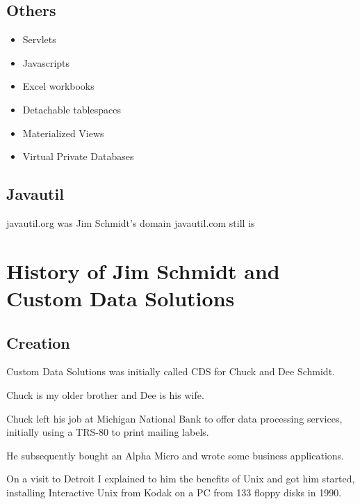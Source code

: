 \documentclass[letterpaper,10pt,english]{sphinxmanual}
\begin{document}
\subsection{Others}
\label{\detokenize{Contributions:others}}\begin{itemize}
\item {} 
Servlets

\item {} 
Javascripts

\item {} 
Excel workbooks

\item {} 
Detachable tablespaces

\item {} 
Materialized Views

\item {} 
Virtual Private Databases

\end{itemize}


\subsection{Javautil}
\label{\detokenize{Contributions:javautil}}
javautil.org was Jim Schmidt’s domain
javautil.com still is


\section{History of Jim Schmidt and Custom Data Solutions}
\label{\detokenize{Contributions:history-of-jim-schmidt-and-custom-data-solutions}}

\subsection{Creation}
\label{\detokenize{Contributions:creation}}
Custom Data Solutions was initially called CDS for Chuck and Dee Schmidt.

Chuck is my older brother and Dee is his wife.

Chuck left his job at Michigan National Bank to offer data processing services, initially using a TRS-80 to print mailing labels.

He subsequently bought an Alpha Micro  and wrote some business applications.

On a visit to Detroit I explained to him the benefits of Unix and got him started, installing Interactive Unix from Kodak on a PC from 133 floppy disks in 1990.
\end{document}
